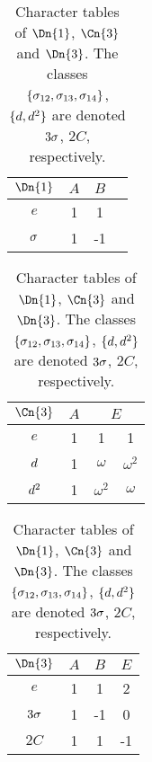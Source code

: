 
\begin{table}[h]
  \caption[Character tables of $\Dn{1}$, $\Cn{3}$ and $\Dn{3}$]{
    Character tables of $\Dn{1}$, $\Cn{3}$ and $\Dn{3}$.
    The classes
    $\{\sigma_{12},\sigma_{13},\sigma_{14}\}$, $\{ d, d^2 \}$
    are denoted $3\sigma$, $2C$, respectively.
  }
  \label{tab:D3charac}
  \centering
  \begin{tabular}{c|ccc}
    $\Dn{1}$ & $A$ & $B$ \\
    \hline
    $e$  & 1 & 1  \\
    $\sigma$ & 1 & -1
  \end{tabular}
  \qquad
  \begin{tabular}{c|ccc}
    $\Cn{3}$ & $A$ & \multicolumn{2}{c}{$E$}  \\
    \hline
    $e$ & 1 & 1  & 1 \\
    $d$ & 1 & $\omega$ & $\omega^2$ \\
    $d^2$ & 1 & $\omega^2$  & $\omega$
  \end{tabular}
  \qquad
  \begin{tabular}{c|ccc}
    $\Dn{3}$ & $A$ & $B$ & $E$ \\
    \hline
    $e$ & 1 & 1  & 2 \\
    $3\sigma$ & 1 & -1 & 0 \\
    $2C$   & 1 & 1  & -1
  \end{tabular}
\end{table}

